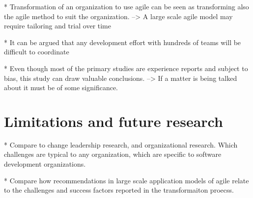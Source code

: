 \documentclass[preprint,authoryear,12pt]{elsarticle}
\begin{document}
* Transformation of an organization to use agile can be seen as transforming
  also the agile method to suit the organization.
  --> A large scale agile model may require tailoring and trial over time

* It can be argued that any development effort with hundreds of teams will be
  difficult to coordinate

* Even though most of the primary studies are experience reports and subject to
  bias, this study can draw valuable conclusions. --> If a matter is being
  talked about it must be of some significance.

\section{Limitations and future research}
\label{sec:conclusion}

* Compare to change leadership research, and organizational research. Which
  challenges are typical to any organization, which are specific to software
  development organizations.

* Compare how recommendations in large scale application models of agile relate
  to the challenges and success factors reported in the transformaiton proecss. 






\end{document}

